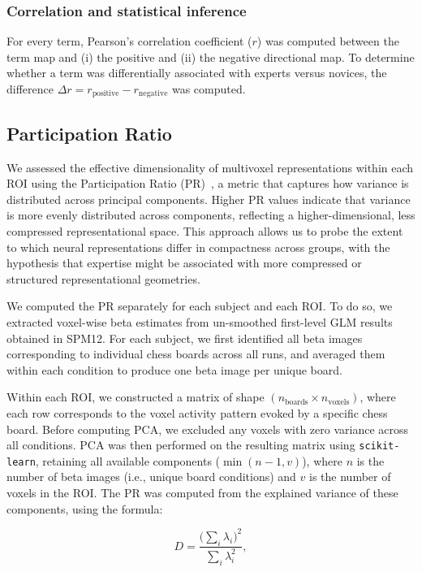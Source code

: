 \documentclass[preprint,12pt]{elsarticle}
\begin{document}
\subsubsection{Correlation and statistical inference}
For every term, Pearson’s correlation coefficient ($r$) was computed between the term map and (i) the positive and (ii) the negative directional map. To determine whether a term was differentially associated with experts versus novices, the difference $\Delta r=r_{\text{positive}}-r_{\text{negative}}$ was computed. 

\subsection{Participation Ratio}
We assessed the effective dimensionality of multivoxel representations within each ROI using the Participation Ratio (PR)~\cite{gao2017theory, altan2021estimating}, a metric that captures how variance is distributed across principal components. Higher PR values indicate that variance is more evenly distributed across components, reflecting a higher-dimensional, less compressed representational space. This approach allows us to probe the extent to which neural representations differ in compactness across groups, with the hypothesis that expertise might be associated with more compressed or structured representational geometries.

We computed the PR separately for each subject and each ROI. To do so, we extracted voxel-wise beta estimates from un-smoothed first-level GLM results obtained in SPM12. For each subject, we first identified all beta images corresponding to individual chess boards across all runs, and averaged them within each condition to produce one beta image per unique board.

Within each ROI, we constructed a matrix of shape $(n_\text{boards} \times n_\text{voxels})$, where each row corresponds to the voxel activity pattern evoked by a specific chess board. Before computing PCA, we excluded any voxels with zero variance across all conditions. PCA was then performed on the resulting matrix using \texttt{scikit-learn}, retaining all available components ($\min(n-1, v)$), where $n$ is the number of beta images (i.e., unique board conditions) and $v$ is the number of voxels in the ROI. The PR was computed from the explained variance of these components, using the formula:

\[
D = \frac{\bigl(\sum_i \lambda_i\bigr)^2}{\sum_i \lambda_i^2},
\]
\end{document}
